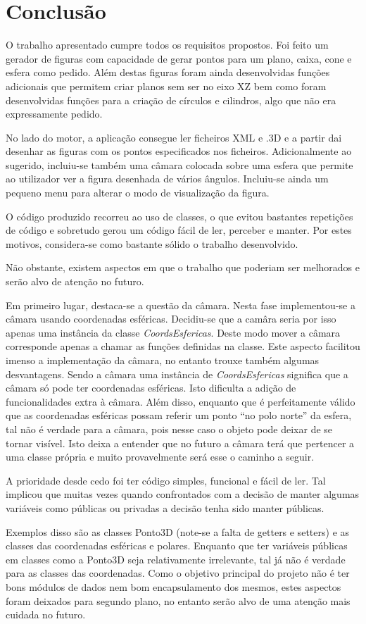 \chapter{Conclusão}

O trabalho apresentado cumpre todos os requisitos propostos.
Foi feito um gerador de figuras com capacidade de gerar pontos para um plano, caixa, cone e esfera como pedido. Além destas figuras foram ainda desenvolvidas funções adicionais que permitem criar planos sem ser no eixo XZ bem como foram desenvolvidas funções para a criação de círculos e cilindros, algo que não era expressamente pedido.

No lado do motor, a aplicação consegue ler ficheiros XML e .3D e a partir dai desenhar as figuras com os pontos especificados nos ficheiros. Adicionalmente ao sugerido, incluiu-se também uma câmara colocada sobre uma esfera que permite ao utilizador ver a figura desenhada de vários ângulos. Incluiu-se ainda um pequeno menu para alterar o modo de visualização da figura.

O código produzido recorreu ao uso de classes, o que evitou bastantes repetições de código e sobretudo gerou um código fácil de ler, perceber e manter. Por estes motivos, considera-se como bastante sólido o trabalho desenvolvido.

Não obstante, existem aspectos em que o trabalho que poderiam ser melhorados e serão alvo de atenção no futuro. 

Em primeiro lugar, destaca-se a questão da câmara. Nesta fase implementou-se a câmara usando coordenadas esféricas. Decidiu-se que a camâra seria por isso apenas uma instância da classe \textit{CoordsEsfericas}. Deste modo mover a câmara corresponde apenas a chamar as funções definidas na classe. Este aspecto facilitou imenso a implementação da câmara, no entanto trouxe também algumas desvantagens. Sendo a câmara uma instância de \textit{CoordsEsfericas} significa que a câmara só pode ter coordenadas esféricas. Isto dificulta a adição de funcionalidades extra à câmara. Além disso, enquanto que é perfeitamente válido que as coordenadas esféricas possam referir um ponto ``no polo norte'' da esfera, tal não é verdade para a câmara, pois nesse caso o objeto pode deixar de se tornar visível. Isto deixa a entender que no futuro a câmara terá que pertencer a uma classe própria e muito provavelmente será esse o caminho a seguir.

A prioridade desde cedo foi ter código simples, funcional e fácil de ler. Tal implicou que muitas vezes quando confrontados com a decisão de manter algumas variáveis como públicas ou privadas a decisão tenha sido manter públicas.


Exemplos disso são as classes Ponto3D (note-se a falta de getters e setters) e as classes das coordenadas esféricas e polares. Enquanto que ter variáveis públicas em classes como a Ponto3D seja relativamente irrelevante, tal já não é verdade para as classes das coordenadas. Como o objetivo principal do projeto não é ter bons módulos de dados nem bom encapsulamento dos mesmos, estes aspectos foram deixados para segundo plano, no entanto serão alvo de uma atenção mais cuidada no futuro.